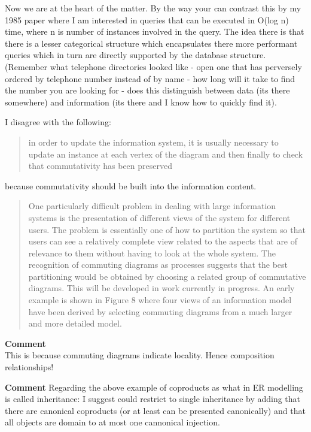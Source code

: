 \documentclass[10pt,a4paper]{scrartcl}
\begin{document}
Now we are at the heart of the matter. By the way your can contrast this by my 1985 paper where I am interested in queries that can
be executed in O(log n) time, where n is number of instances involved in the query. The idea there is that there is a lesser
categorical structure which encapsulates there more performant queries which in turn are directly supported by the database structure.
(Remember what telephone directories looked like - open one that has perversely ordered by telephone number instead of by name -
how long will it take to find the number you are looking for - does this distinguish between data (its there somewhere) and information
(its there and I know how to quickly find it).  


I disagree with the following:
\begin{quote}
in order to update the information system, it is usually necessary to
update an instance at each vertex of the diagram and then finally to check that
commutativity has been preserved
\end{quote}
because commutativity should be built into the information content.

\begin{quote}
One particularly difficult problem in dealing with large information systems
is the presentation of different views of the system for different users. The
problem is essentially one of how to partition the system so that users can see
a relatively complete view related to the aspects that are of relevance to them
without having to look at the whole system. The recognition of commuting
diagrams as processes suggests that the best partitioning would be obtained
by choosing a related group of commutative diagrams. This will be developed
in work currently in progress. An early example is shown in Figure 8 where
four views of an information model have been derived by selecting commuting
diagrams from a much larger and more detailed model.
\end{quote}
\textbf{Comment}\\

This is because commuting diagrams indicate locality. Hence composition relationships!

\textbf{Comment}
Regarding the above example of coproducts as what in ER modelling is called inheritance: I suggest could restrict to single inheritance by adding that
there are canonical coproducts (or at least can be presented canonically) and that all objects are domain to at most
one cannonical injection. 
\end{document}
